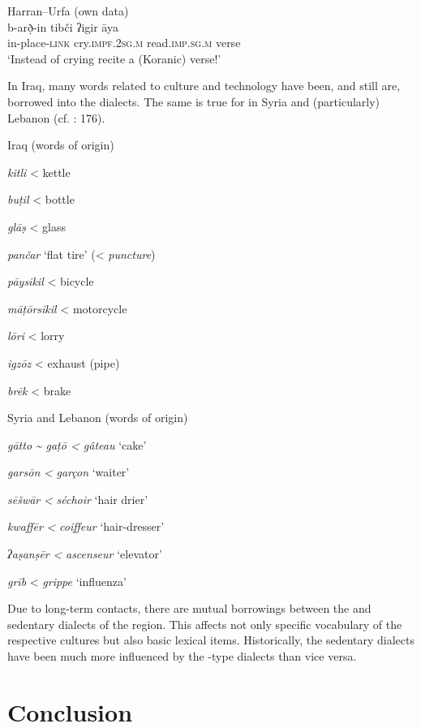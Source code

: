 \documentclass[output=paper]{langsci/langscibook}
\begin{document}
\ea 
{Harran--Urfa (own data)}\\
\gll    b-arð̣-in tibči ʔigir āya\\
     in-place-\textsc{link} cry.\textsc{impf.2sg.m} read.\textsc{imp.sg.m} verse\\
\glt ‘Instead of crying recite a (Koranic) verse!’
\z

In Iraq, many  words related to  culture and technology have been, and still are, borrowed into the dialects. The same is true for  in Syria and (particularly) Lebanon (cf. \citealt{Barbot1961}: 176).

\ea
Iraq (words of  origin)

\textit{kitli} < kettle 

\textit{buṭil} < bottle

\textit{glāṣ} < glass

\textit{pančar} ‘flat tire’ (< \textit{puncture})

\textit{pāysikil} < bicycle

\textit{māṭōrsikil} < motorcycle

\textit{lōri} < lorry 

\textit{igzōz} < exhaust (pipe)

\textit{brēk} < brake
\z

\ea
Syria and Lebanon (words of  origin)

\textit{gātto} \textit{{\textasciitilde} gaṭō < gâteau} ‘cake’

\textit{garsōn} \textit{<} \textit{garçon} ‘waiter’

\textit{sēšwār} \textit{<} \textit{séchoir} ‘hair drier’

\textit{kwaffēr} \textit{<} \textit{coiffeur} ‘hair-dresser’

\textit{ʔaṣanṣēr} \textit{<} \textit{ascenseur} ‘elevator’

\textit{grīb} < \textit{grippe} ‘influenza’
\z

Due to long-term contacts, there are mutual borrowings between the  and sedentary dialects of the region. This affects not only specific vocabulary of the respective cultures but also basic lexical items. Historically, the sedentary dialects have been much more influenced by the -type dialects than vice versa. 

\section{Conclusion} 
\end{document}
